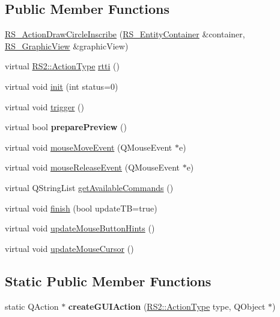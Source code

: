 \subsection*{Public Member Functions}
\begin{DoxyCompactItemize}
\item 
\hyperlink{classRS__ActionDrawCircleInscribe_a851574e4553acf38e6acc9d32ec16b95}{R\-S\-\_\-\-Action\-Draw\-Circle\-Inscribe} (\hyperlink{classRS__EntityContainer}{R\-S\-\_\-\-Entity\-Container} \&container, \hyperlink{classRS__GraphicView}{R\-S\-\_\-\-Graphic\-View} \&graphic\-View)
\item 
virtual \hyperlink{classRS2_afe3523e0bc41fd637b892321cfc4b9d7}{R\-S2\-::\-Action\-Type} \hyperlink{classRS__ActionDrawCircleInscribe_a56e24eedc383ba063300515df2b53e50}{rtti} ()
\item 
virtual void \hyperlink{classRS__ActionDrawCircleInscribe_acd6250f1447c54f6926951da676ea186}{init} (int status=0)
\item 
virtual void \hyperlink{classRS__ActionDrawCircleInscribe_a98e3bb1e0ce8be658e5fd1c7db835997}{trigger} ()
\item 
\hypertarget{classRS__ActionDrawCircleInscribe_a887da2124e14faa5f905f8632d253f3d}{virtual bool {\bfseries prepare\-Preview} ()}\label{classRS__ActionDrawCircleInscribe_a887da2124e14faa5f905f8632d253f3d}

\item 
virtual void \hyperlink{classRS__ActionDrawCircleInscribe_a5098b55f0e61bd742449022da2a2f7cf}{mouse\-Move\-Event} (Q\-Mouse\-Event $\ast$e)
\item 
virtual void \hyperlink{classRS__ActionDrawCircleInscribe_ad2a5888655626ef47fd30abaa51740be}{mouse\-Release\-Event} (Q\-Mouse\-Event $\ast$e)
\item 
virtual Q\-String\-List \hyperlink{classRS__ActionDrawCircleInscribe_ae073c0386f96ec32776d60b5d4c86980}{get\-Available\-Commands} ()
\item 
virtual void \hyperlink{classRS__ActionDrawCircleInscribe_a60a03a1e8a713712a3b6ec2887ad5f77}{finish} (bool update\-T\-B=true)
\item 
virtual void \hyperlink{classRS__ActionDrawCircleInscribe_aaaa0905d57394a24f04b93203a191d70}{update\-Mouse\-Button\-Hints} ()
\item 
virtual void \hyperlink{classRS__ActionDrawCircleInscribe_ade2d97380bea9bcf2d8f68bc2c32701e}{update\-Mouse\-Cursor} ()
\end{DoxyCompactItemize}
\subsection*{Static Public Member Functions}
\begin{DoxyCompactItemize}
\item 
\hypertarget{classRS__ActionDrawCircleInscribe_a5ce346fadb4a3f43aec9112647bb0024}{static Q\-Action $\ast$ {\bfseries create\-G\-U\-I\-Action} (\hyperlink{classRS2_afe3523e0bc41fd637b892321cfc4b9d7}{R\-S2\-::\-Action\-Type} type, Q\-Object $\ast$)}\label{classRS__ActionDrawCircleInscribe_a5ce346fadb4a3f43aec9112647bb0024}

\end{DoxyCompactItemize}
